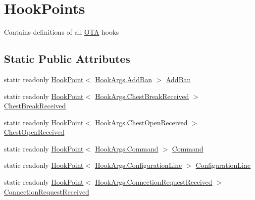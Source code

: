 \hypertarget{classOTA_1_1Plugin_1_1HookPoints}{}\section{Hook\+Points}
\label{classOTA_1_1Plugin_1_1HookPoints}


Contains definitions of all \hyperlink{namespaceOTA}{O\+T\+A} hooks  


\subsection*{Static Public Attributes}
\begin{DoxyCompactItemize}
\item 
static readonly \hyperlink{classOTA_1_1Plugin_1_1HookPoint}{Hook\+Point}$<$ \hyperlink{structOTA_1_1Plugin_1_1HookArgs_1_1AddBan}{Hook\+Args.\+Add\+Ban} $>$ \hyperlink{classOTA_1_1Plugin_1_1HookPoints_a45ef72db25782e1b6742db9781130a6d}{Add\+Ban}
\item 
static readonly \hyperlink{classOTA_1_1Plugin_1_1HookPoint}{Hook\+Point}$<$ \hyperlink{structOTA_1_1Plugin_1_1HookArgs_1_1ChestBreakReceived}{Hook\+Args.\+Chest\+Break\+Received} $>$ \hyperlink{classOTA_1_1Plugin_1_1HookPoints_a44936c5e2c7e5fb2c4961744fecdbde6}{Chest\+Break\+Received}
\item 
static readonly \hyperlink{classOTA_1_1Plugin_1_1HookPoint}{Hook\+Point}$<$ \hyperlink{structOTA_1_1Plugin_1_1HookArgs_1_1ChestOpenReceived}{Hook\+Args.\+Chest\+Open\+Received} $>$ \hyperlink{classOTA_1_1Plugin_1_1HookPoints_a22265cb29c22e592918406e64045593f}{Chest\+Open\+Received}
\item 
static readonly \hyperlink{classOTA_1_1Plugin_1_1HookPoint}{Hook\+Point}$<$ \hyperlink{structOTA_1_1Plugin_1_1HookArgs_1_1Command}{Hook\+Args.\+Command} $>$ \hyperlink{classOTA_1_1Plugin_1_1HookPoints_ac6b80799a4ba01c4da65b5e5e256a5c8}{Command}
\item 
static readonly \hyperlink{classOTA_1_1Plugin_1_1HookPoint}{Hook\+Point}$<$ \hyperlink{structOTA_1_1Plugin_1_1HookArgs_1_1ConfigurationLine}{Hook\+Args.\+Configuration\+Line} $>$ \hyperlink{classOTA_1_1Plugin_1_1HookPoints_aa4588756c795847a960dd396ca326d63}{Configuration\+Line}
\item 
static readonly \hyperlink{classOTA_1_1Plugin_1_1HookPoint}{Hook\+Point}$<$ \hyperlink{structOTA_1_1Plugin_1_1HookArgs_1_1ConnectionRequestReceived}{Hook\+Args.\+Connection\+Request\+Received} $>$ \hyperlink{classOTA_1_1Plugin_1_1HookPoints_a30da72a5b7115717b11f4d21a097d24d}{Connection\+Request\+Received}

\end{DoxyCompactItemize}
